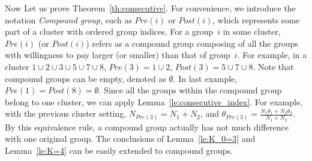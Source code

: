 \documentclass[twocolumn,10pt,twosided]{IEEEtran}
\begin{document}
Now Let us prove Theorem~\ref{th:consecutive}.
For convenience, we introduce the notation \emph{Compound group},
such as $Pre(i)$ or $Post(i)$, which represents some part of a
cluster with ordered group indices. For a group~$i$ in some
cluster, $Pre(i)$ (or $Post(i)$) refers as a compound group
composing of all the groups with willingness to pay larger (or
smaller) than that of group~$i$. For example, in a cluster
$1\cup 2\cup 3\cup 5\cup 7\cup 8$, $Pre(3)=1\cup 2$, $Post(3)=5\cup
7\cup 8$.  Note that compound groups can be empty, denoted as
$\emptyset$. In last example, $Pre(1)=Post(8)=\emptyset$. Since all
the groups within the compound group belong to one cluster, we
can apply  Lemma~\ref{le:consecutive_index}. For example, with the
previous cluster setting, $N_{Pre(3)}=N_1+N_2$, and
$\theta_{Pre(3)}=\frac{N_1\theta_1+N_2\theta_2}{N_1+N_2}$. By this
equivalence rule, a compound group actually has not much difference
with one original group. The conclusions of Lemma~\ref{le:K_0=3} and
Lemma~\ref{le:K=4} can be easily extended to compound groups.
\end{document}
